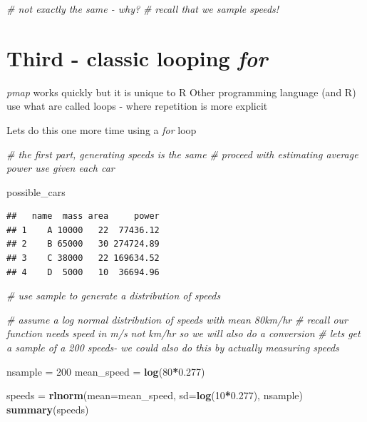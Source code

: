 \documentclass[
]{article}
\newenvironment{Shaded}{\begin{snugshade}}{\end{snugshade}}
\newcommand{\AttributeTok}[1]{\textcolor[rgb]{0.13,0.29,0.53}{#1}}
\newcommand{\CommentTok}[1]{\textcolor[rgb]{0.56,0.35,0.01}{\textit{#1}}}
\newcommand{\DecValTok}[1]{\textcolor[rgb]{0.00,0.00,0.81}{#1}}
\newcommand{\FloatTok}[1]{\textcolor[rgb]{0.00,0.00,0.81}{#1}}
\newcommand{\FunctionTok}[1]{\textcolor[rgb]{0.13,0.29,0.53}{\textbf{#1}}}
\newcommand{\NormalTok}[1]{#1}
\newcommand{\OtherTok}[1]{\textcolor[rgb]{0.56,0.35,0.01}{#1}}
\newcommand{\SpecialCharTok}[1]{\textcolor[rgb]{0.81,0.36,0.00}{\textbf{#1}}}
\begin{document}
\begin{Shaded}
\begin{Highlighting}[]
\CommentTok{\# not exactly the same {-} why?}
\CommentTok{\# recall that we sample speeds!}
\end{Highlighting}
\end{Shaded}

\section{\texorpdfstring{Third - classic looping
\emph{for}}{Third - classic looping for}}\label{third---classic-looping-for}

\emph{pmap} works quickly but it is unique to R Other programming
language (and R) use what are called loops - where repetition is more
explicit

Lets do this one more time using a \emph{for} loop

\begin{Shaded}
\begin{Highlighting}[]
\CommentTok{\# the first part, generating speeds is the same}
\CommentTok{\# proceed with estimating average power use given  each car}

\NormalTok{possible\_cars}
\end{Highlighting}
\end{Shaded}

\begin{verbatim}
##   name  mass area     power
## 1    A 10000   22  77436.12
## 2    B 65000   30 274724.89
## 3    C 38000   22 169634.52
## 4    D  5000   10  36694.96
\end{verbatim}

\begin{Shaded}
\begin{Highlighting}[]
\CommentTok{\# use sample to generate a distribution of speeds}

\CommentTok{\# assume a log normal distribution of speeds with mean 80km/hr}
\CommentTok{\# recall our function needs speed in m/s not km/hr so we will also do a conversion}
\CommentTok{\# lets get a sample of a 200 speeds{-} we could also do this by actually measuring speeds}

\NormalTok{nsample }\OtherTok{=} \DecValTok{200}
\NormalTok{mean\_speed }\OtherTok{=} \FunctionTok{log}\NormalTok{(}\DecValTok{80}\SpecialCharTok{*}\FloatTok{0.277}\NormalTok{)}

\NormalTok{speeds }\OtherTok{=} \FunctionTok{rlnorm}\NormalTok{(}\AttributeTok{mean=}\NormalTok{mean\_speed, }\AttributeTok{sd=}\FunctionTok{log}\NormalTok{(}\DecValTok{10}\SpecialCharTok{*}\FloatTok{0.277}\NormalTok{), nsample)}
\FunctionTok{summary}\NormalTok{(speeds)}
\end{Highlighting}
\end{Shaded}
\end{document}
